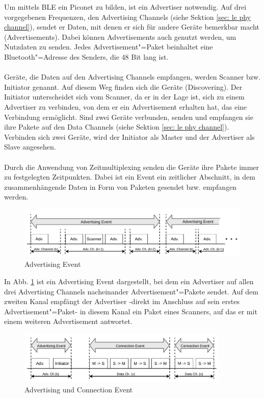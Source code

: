 Um mittels BLE ein Piconet zu bilden, ist ein Advertiser notwendig. Auf drei vorgegebenen Frequenzen, den Advertising Channels (siehe Sektion \ref{sec: le phy channel}), sendet er Daten, mit denen er sich für andere Geräte bemerkbar macht (Advertisements). Dabei können Advertisements auch genutzt werden, um Nutzdaten zu senden. Jedes Advertisement"=Paket beinhaltet eine Bluetooth"=Adresse des Senders, die 48 Bit lang ist.
\\\\
Geräte, die Daten auf den Advertising Channels empfangen, werden Scanner bzw. Initiator genannt. Auf diesem Weg finden sich die Geräte (Discovering). Der Initiator unterscheidet sich vom Scanner, da er in der Lage ist, sich zu einem Advertiser zu verbinden, von dem er ein Advertisement erhalten hat, das eine Verbindung ermöglicht. Sind zwei Geräte verbunden, senden und empfangen sie ihre Pakete auf den Data Channels (siehe Sektion \ref{sec: le phy channel}). Verbinden sich zwei Geräte, wird der Initiator als Master und der Advertiser als Slave angesehen.
\\\\
Durch die Anwendung von Zeitmultiplexing senden die Geräte ihre Pakete immer zu festgelegten Zeitpunkten. Dabei ist ein Event ein zeitlicher Abschnitt, in dem zusammenhängende Daten in Form von Paketen gesendet bzw. empfangen werden.

\begin{figure}[H]
    \centering
    \includegraphics[width=\textwidth]{graphics/advertising_event.pdf}
    \caption[Advertising Event]{Advertising Event \cite{BtSpec4.0_127}}
    \label{fig: adv event}
\end{figure}

In Abb. \ref{fig: adv event} ist ein Advertising Event dargestellt, bei dem ein Advertiser auf allen drei Advertising Channels nacheinander Advertisement"=Pakete sendet. Auf dem zweiten Kanal empfängt der Advertiser -direkt im Anschluss auf sein erstes Advertisement"=Paket- in diesem Kanal ein Paket eines Scanners, auf das er mit einem weiteren Advertisement antwortet.

\begin{figure}[H]
    \centering
    \includegraphics[width=0.9\textwidth]{graphics/advertising_initiator_event.pdf}
    \caption[Advertising und Connection Event]{Advertising und Connection Event \cite{BtSpec4.0_127}}
    \label{fig: adv init}
\end{figure}

